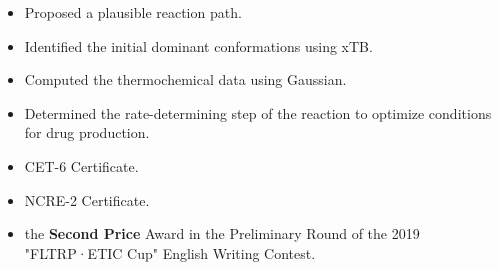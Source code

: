 \documentclass[10pt,a4paper]{altacv}
\begin{document}
\begin{itemize}
\item Proposed a plausible reaction path.
\item Identified the initial dominant conformations using xTB.
\item Computed the thermochemical data using Gaussian.
\item Determined the rate-determining step of the reaction to optimize conditions for drug production.
\end{itemize}



\begin{itemize}
\item CET-6 Certificate.
\item NCRE-2 Certificate.
\item the \textbf{Second Price} Award in the Preliminary Round of the 2019 "FLTRP·ETIC Cup" English Writing Contest.
\end{itemize}







\clearpage
\end{document}
